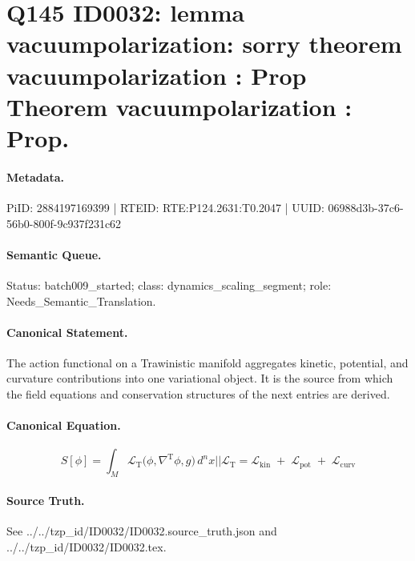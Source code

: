 \section*{Q145 ID0032: lemma vacuumpolarization: sorry theorem vacuumpolarization : Prop Theorem vacuumpolarization : Prop.}
\paragraph{Metadata.}
PiID: 2884197169399 | RTEID: RTE:P124.2631:T0.2047 | UUID: 06988d3b-37c6-56b0-800f-9c937f231c62

\paragraph{Semantic Queue.}
Status: batch009\_started; class: dynamics\_scaling\_segment; role: Needs\_Semantic\_Translation.

\paragraph{Canonical Statement.}
The action functional on a Trawinistic manifold aggregates kinetic, potential, and curvature contributions into one variational object. It is the source from which the field equations and conservation structures of the next entries are derived.

\paragraph{Canonical Equation.}
\[
S[\phi] = \int_{M} \mathcal{L}_{\mathrm{T}} \bigl( \phi,\nabla^{\mathrm{T}}\phi,g \bigr)\, d^{n}x || \mathcal{L}_{\mathrm{T}} = \mathcal{L}_{\mathrm{kin}} \;+\; \mathcal{L}_{\mathrm{pot}} \;+\; \mathcal{L}_{\mathrm{curv}}
\]

\paragraph{Source Truth.}
See ../../tzp\_id/ID0032/ID0032.source\_truth.json and ../../tzp\_id/ID0032/ID0032.tex.
